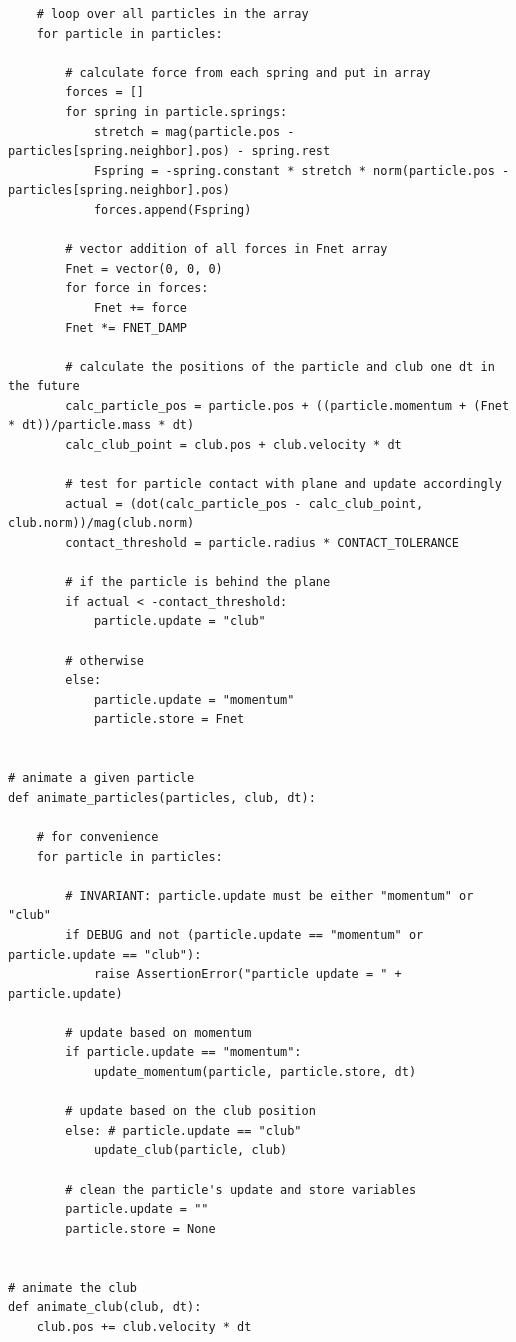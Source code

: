 \documentclass{article}
\begin{document}
\begin{verbatim}
    # loop over all particles in the array
    for particle in particles:
        
        # calculate force from each spring and put in array
        forces = []
        for spring in particle.springs:
            stretch = mag(particle.pos - particles[spring.neighbor].pos) - spring.rest
            Fspring = -spring.constant * stretch * norm(particle.pos - particles[spring.neighbor].pos)
            forces.append(Fspring)

        # vector addition of all forces in Fnet array
        Fnet = vector(0, 0, 0)
        for force in forces:
            Fnet += force
        Fnet *= FNET_DAMP

        # calculate the positions of the particle and club one dt in the future
        calc_particle_pos = particle.pos + ((particle.momentum + (Fnet * dt))/particle.mass * dt)
        calc_club_point = club.pos + club.velocity * dt

        # test for particle contact with plane and update accordingly
        actual = (dot(calc_particle_pos - calc_club_point, club.norm))/mag(club.norm)
        contact_threshold = particle.radius * CONTACT_TOLERANCE

        # if the particle is behind the plane
        if actual < -contact_threshold:
            particle.update = "club"

        # otherwise
        else:
            particle.update = "momentum"
            particle.store = Fnet
        

# animate a given particle
def animate_particles(particles, club, dt):

    # for convenience
    for particle in particles:

        # INVARIANT: particle.update must be either "momentum" or "club"
        if DEBUG and not (particle.update == "momentum" or particle.update == "club"):
            raise AssertionError("particle update = " + particle.update)
        
        # update based on momentum
        if particle.update == "momentum":
            update_momentum(particle, particle.store, dt)

        # update based on the club position
        else: # particle.update == "club"
            update_club(particle, club)

        # clean the particle's update and store variables
        particle.update = ""
        particle.store = None


# animate the club
def animate_club(club, dt):
    club.pos += club.velocity * dt


\end{verbatim}
\end{document}
